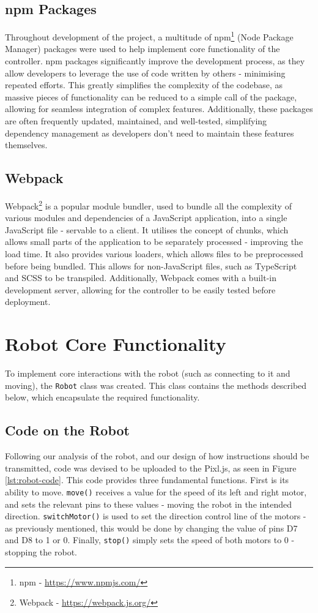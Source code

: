 \documentclass{l4proj}
\begin{document}
\subsection{npm Packages}
Throughout development of the project, a multitude of npm\footnote{npm - \url{https://www.npmjs.com/}} (Node Package Manager) packages were used to help implement core functionality of the controller. npm packages significantly improve the development process, as they allow developers to leverage the use of code written by others - minimising repeated efforts. This greatly simplifies the complexity of the codebase, as massive pieces of functionality can be reduced to a simple call of the package, allowing for seamless integration of complex features. Additionally, these packages are often frequently updated, maintained, and well-tested, simplifying dependency management as developers don’t need to maintain these features themselves.

\subsection{Webpack}
Webpack\footnote{Webpack - \url{https://webpack.js.org/}} is a popular module bundler, used to bundle all the complexity of various modules and dependencies of a JavaScript application, into a single JavaScript file - servable to a client. It utilises the concept of chunks, which allows small parts of the application to be separately processed - improving the load time. It also provides various loaders, which allows files to be preprocessed before being bundled. This allows for non-JavaScript files, such as TypeScript and SCSS to be transpiled. Additionally, Webpack comes with a built-in development server, allowing for the controller to be easily tested before deployment.


\section{Robot Core Functionality}
To implement core interactions with the robot (such as connecting to it and moving), the \lstinline{Robot} class was created. This class contains the methods described below, which encapsulate the required functionality.

\subsection{Code on the Robot}
Following our analysis of the robot, and our design of how instructions should be transmitted, code was devised to be uploaded to the Pixl.js, as seen in Figure \ref{lst:robot-code}. This code provides three fundamental functions. First is its ability to move. \lstinline{move()} receives a value for the speed of its left and right motor, and sets the relevant pins to these values - moving the robot in the intended direction. \lstinline{switchMotor()} is used to set the direction control line of the motors - as previously mentioned, this would be done by changing the value of pins D7 and D8 to 1 or 0. Finally, \lstinline{stop()} simply sets the speed of both motors to 0 - stopping the robot.
\end{document}
